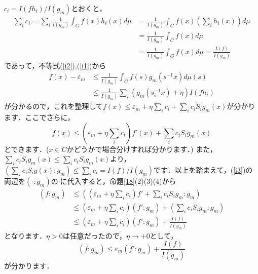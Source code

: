 \begin{Proof}
$c_i=I(fh_i)/I(g_{m})$とおくと，
\begin{align*}
\sum_{i}c_{i}=\sum_{i} \frac{1}{I(g_{m})} \int_{G}f(x)h_{i}(x)d\mu & = \frac{1}{I(g_{m})}\int_{C}f(x) \left( \sum_{i}h_{i}(x) \right) d\mu \\
 & =\frac{1}{I(g_{m})}\int_{C}f(x) d\mu \\
 & =\frac{1}{I(g_{m})}\int_{G}f(x) d\mu=\frac{I(f)}{I(g_{m})}
\end{align*}
であって，不等式(\ref{i2}),(\ref{i1})から
\begin{align*}
f(x)-\varepsilon_{m} & \le \frac{1}{I(g_{m})} \int_{G}f(s)g_{m}(s^{-1}x)d\mu(s) \\ 
 & \le \frac{1}{I(g_{m})} \sum_{i}\left( g_{m}(s_{i}^{-1}x) + \eta \right)I(fh_{i})
\end{align*}
が分かるので，これを整理して$f(x) \le \varepsilon_{m} + \eta \sum_{i}c_{i} + \sum_{i}c_{i}S_{i}g_{m}(x)$が分かります．ここでさらに，
\begin{equation}
f(x) \le \left( \varepsilon_{m} + \eta \sum_{i}c_{i} \right)f'(x) + \sum_{i}c_{i}S_{i}g_{m}(x)
\label{i3}
\end{equation}
とできます．($x \in C$かどうかで場合分けすれば分かります．) また，$\sum_{i}c_{i}S_{i}g_{m}(x) \le \sum_{i}c_{i}S_{i}g_{m}(x)$より， $\left( \sum_{i}c_{i}S_{i}g(x) : g_{m} \right) \le \sum_{i}c_{i}=I(f)/I(g_{m})$です．以上を踏まえて，(\ref{i3})の両辺を$\left( \cdot : g_{m} \right) $の$\cdot$に代入すると，命題\ref{18}(2)(3)(4)から 
\begin{align*}
\left( f : g_{m} \right) & \le \left( \left( \varepsilon_{m} + \eta \sum_{i}c_{i} \right)f' +  \sum_{i}c_{i}S_{i}g_{m} : g_{m} \right) \\
 & \le \left( \varepsilon_{m} + \eta \sum_{i}c_{i} \right) \left( f' : g_{m} \right) + \left( \sum_{i}c_{i}S_{i}g_{m} : g_{m} \right) \\
 & \le \left( \varepsilon_{m} + \eta \sum_{i}c_{i} \right) \left( f' : g_{m} \right) + \frac{I(f)}{I(g_{m})}
\end{align*}
となります．$\eta>0$は任意だったので，$\eta \to +0$として，
\begin{equation}
\left( f : g_{m} \right) \le \varepsilon_{m} \left( f' : g_{m} \right) + \frac{I(f)}{I(g_{m})}
\label{i4}
\end{equation}
が分かります．


\end{Proof}
